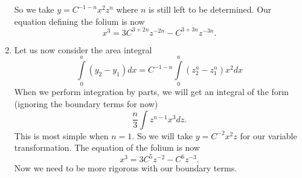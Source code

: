 \begin{enumerate}
So we take \(y = C^{-1 - n} x^2 z^n\) where \(n\) is still left to be determined. Our equation defining the folium is now
\begin{equation}
x^3 = 3C^{3 + 2n} z^{-2n} - C^{3 + 3n} z^{-3n}.
\end{equation}

\item
Let us now consider the area integral
\begin{equation}
\int\limits_0^a (y_2 - y_1) dx = C^{-1 - n} \int\limits_0^a (z_2^n - z_1^n) x^2 dx
\end{equation}
When we perform integration by parts, we will get an integral of the form (ignoring the boundary terms for now)
\begin{equation}
\frac{n}{3}\int z^{n - 1} x^3 dz. 
\end{equation}
This is most simple when \(n = 1\). So we will take \(y = C^{-2} x^2 z\) for our variable transformation. The equation of the folium is now
\begin{equation}
x^3 = 3C^5 z^{-2} - C^6 z^{-3}.
\end{equation}
Now we need to be more rigorous with our boundary terms.
\end{enumerate}
